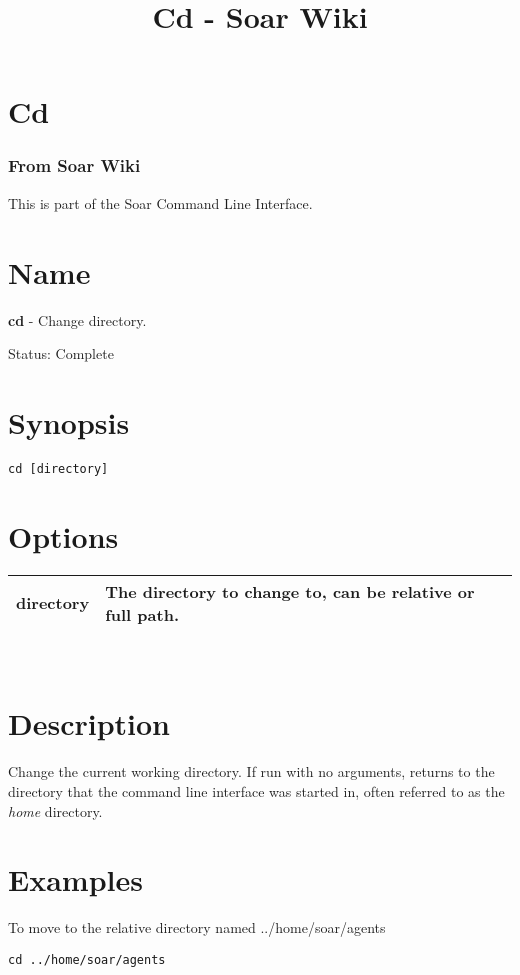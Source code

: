 \documentclass[10pt]{article}
\title{Cd - Soar Wiki}
\begin{document}
\section*{Cd}
\subsubsection*{From Soar Wiki}


 This is part of the Soar Command Line Interface. 
\section*{ Name }


 \textbf{cd}
 - Change directory. 


 Status: Complete
\section*{ Synopsis }
\begin{verbatim}
cd [directory]

\end{verbatim}
\section*{ Options }


\begin{tabular}{|p{1in}|p{5in}|}
\hline 
 directory  & The directory to change to, can be relative or full path.  \\
 \hline 

\end{tabular}



 \\ 

\section*{ Description }


 Change the current working directory. If run with no arguments, returns to the directory that the command line interface was started in, often referred to as the \emph{home}
 directory. 
\section*{ Examples }


 To move to the relative directory named ../home/soar/agents \begin{verbatim}
cd ../home/soar/agents


\end{verbatim}
\end{document}
